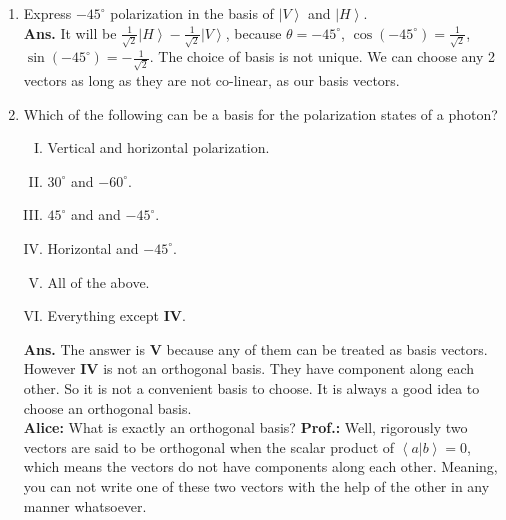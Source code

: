 \documentclass[12pt]{article}
\newcommand\lr{\left \langle}
\newcommand\rr{\right \rangle}
\newcommand\ls{\left |}
\newcommand\rs{\right |}
\newcommand\tbf[1]{\textbf{#1}}
\newcommand\ta{\tbf{Alice: }}
\newcommand\tp{\tbf{Prof.: }}
\begin{document}
\begin{enumerate}[1.]
 		
\item Express $-45^\circ$ polarization in the basis of $\ls V \rr$ and $\ls H \rr$.  \\ \newline
\tbf{Ans. }It will be $\frac{1}{\sqrt{2}}\ls H \rr - \frac{1}{\sqrt{2}}\ls V \rr$, because $\theta = -45^\circ$, $\cos(-45^\circ)=\frac{1}{\sqrt{2}}$, $\sin(-45^\circ)=-\frac{1}{\sqrt{2}}$. \newline
The choice of basis is not unique. We can choose any 2 vectors as long as they are not co-linear, as our basis vectors. \\ \newline
\item Which of the following can be a basis for the polarization states of a photon? \newline
\begin{enumerate}[I.]
\item Vertical and horizontal polarization.
\item $30^\circ$ and $-60^\circ$.
\item $45^\circ$ and and $-45^\circ$.
\item Horizontal and $-45^\circ$.
\item All of the above.
\item Everything except \tbf{IV}. \\ \newline
\end{enumerate} 
\tbf{Ans. }The answer is \tbf{V} because any of them can be treated as basis vectors. However \tbf{IV} is not an orthogonal basis. They have component along each other. So it is not a convenient basis to choose. It is always a good idea to choose an orthogonal basis. \\ \newline
\ta What is exactly an orthogonal basis?
\tp Well, rigorously two vectors are said to be orthogonal when the scalar product of $\lr a \rs \left. b \rr = 0$, which means the vectors do not have components along each other. Meaning, you can not write one of these two vectors with the help of the other in any manner whatsoever.


\end{enumerate}
\end{document}
